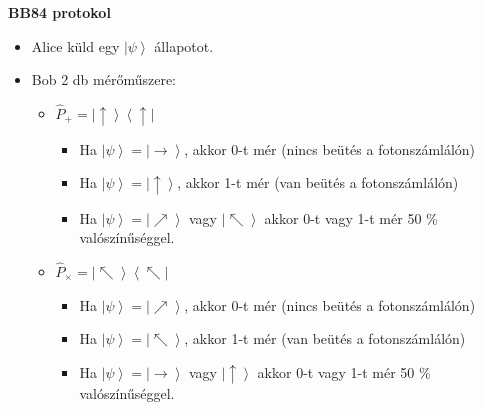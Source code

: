 \documentclass{beamer}
\begin{document}
    \begin{frame}

        \center

        \textbf{BB84 protokol}

        \begin{itemize}
            \item Alice küld egy $\left| \psi \right\rangle$ állapotot.
            \item Bob 2 db mérőműszere:
                \begin{itemize}
                    \item $\hat{P}_+ = \left| \uparrow \right\rangle \left\langle \uparrow \right|$
                        \begin{itemize}
                            \item Ha $\left| \psi \right\rangle = \left| \rightarrow \right\rangle$, akkor 0-t mér (nincs beütés a fotonszámlálón)
                            \item Ha $\left| \psi \right\rangle = \left| \uparrow \right\rangle$, akkor 1-t mér (van beütés a fotonszámlálón)
                            \item Ha $\left| \psi \right\rangle = \left| \nearrow \right\rangle$ vagy $\left| \nwarrow \right\rangle$ akkor 0-t vagy 1-t mér 50 \% valószínűséggel.
                        \end{itemize}
                    \item $\hat{P}_\times = \left| \nwarrow \right\rangle \left\langle \nwarrow \right|$
                        \begin{itemize}
                            \item Ha $\left| \psi \right\rangle = \left| \nearrow \right\rangle$, akkor 0-t mér (nincs beütés a fotonszámlálón)
                            \item Ha $\left| \psi \right\rangle = \left| \nwarrow \right\rangle$, akkor 1-t mér (van beütés a fotonszámlálón)
                            \item Ha $\left| \psi \right\rangle = \left| \rightarrow \right\rangle$ vagy $\left| \uparrow \right\rangle$ akkor 0-t vagy 1-t mér 50 \% valószínűséggel.
                        \end{itemize}
                \end{itemize}
        \end{itemize}

    \end{frame} 
\end{document}
